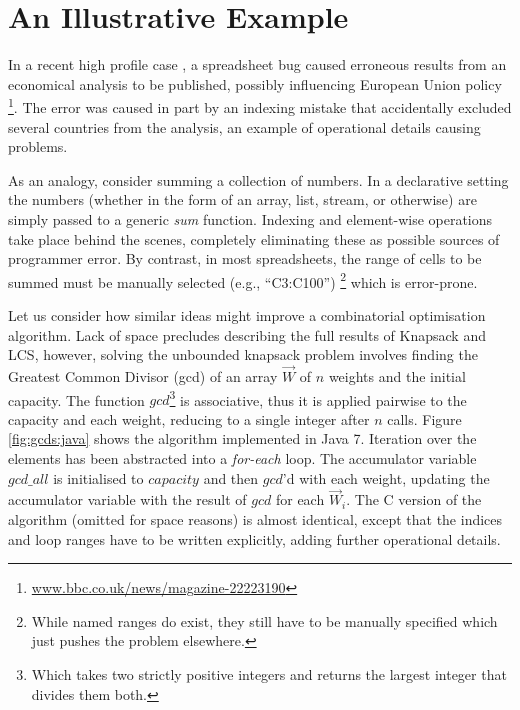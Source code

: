 \section{An Illustrative Example}
In a recent high profile case \cite{Herndon13}, a spreadsheet bug caused
erroneous results from an economical analysis to be published, possibly
influencing European Union policy%
\footnote{\url{www.bbc.co.uk/news/magazine-22223190}}.
The error was caused in part by an indexing mistake that accidentally excluded
several countries from the analysis, an example of operational details causing
problems.

As an analogy, consider summing a collection of numbers. In a declarative
setting
the numbers (whether in the form of an array, list, stream, or
otherwise) are simply passed to a generic \emph{sum} function. Indexing and
element-wise operations take place behind the scenes, completely eliminating
these as possible sources of programmer error. By contrast, in most spreadsheets, the range of cells to
be summed must be manually selected (e.g., ``C3:C100'')%
\footnote{While named ranges do exist, they still have to be manually specified
which just pushes the problem elsewhere.} which is error-prone.


Let us consider how similar ideas might improve a combinatorial
optimisation algorithm. 
Lack of space precludes describing the full results of Knapsack and LCS, however, solving the unbounded knapsack problem involves finding the Greatest Common Divisor (gcd) of an array $\vec{W}$ of $n$
weights and the initial capacity. The function $gcd$\footnote{Which takes two strictly positive integers and returns the largest integer that divides them both.}
is associative, thus it is applied pairwise to the capacity and each weight,
reducing to a single integer after $n$ calls. Figure \ref{fig:gcds:java} shows
the algorithm implemented in Java 7. Iteration over the elements has been
abstracted into a \emph{for-each} loop. The accumulator variable $gcd\_all$ is initialised to $capacity$ and then $gcd$'d with each weight, updating the accumulator
variable with the result of $gcd$ for each $\vec{W}_i$. The C version of
the algorithm (omitted for space reasons) is almost identical, except that the indices and loop ranges have to be written explicitly, adding further
operational details.

